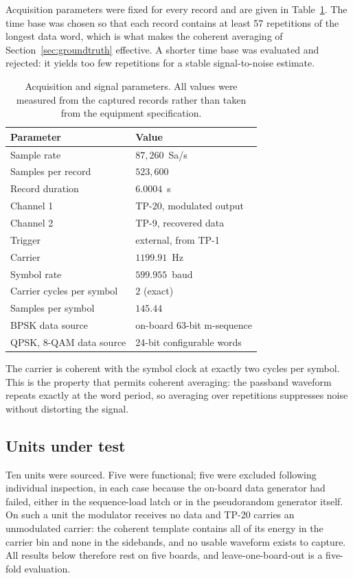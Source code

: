 \documentclass[journal]{IEEEtran}   %
\begin{document}
Acquisition parameters were fixed for every record and are given in
Table~\ref{tab:acq}. The time base was chosen so that each record contains at
least 57 repetitions of the longest data word, which is what makes the coherent
averaging of Section~\ref{sec:groundtruth} effective. A shorter time base was
evaluated and rejected: it yields too few repetitions for a stable
signal-to-noise estimate.

\begin{table}[!t]
\caption{Acquisition and signal parameters. All values were measured from the
captured records rather than taken from the equipment specification.}
\label{tab:acq}
\centering
\small
\begin{tabular}{ll}
\toprule
Parameter & Value \\
\midrule
Sample rate & $87{,}260$~Sa/s \\
Samples per record & $523{,}600$ \\
Record duration & $6.0004$~s \\
Channel 1 & TP-20, modulated output \\
Channel 2 & TP-9, recovered data \\
Trigger & external, from TP-1 \\
\midrule
Carrier & $1199.91$~Hz \\
Symbol rate & $599.955$~baud \\
Carrier cycles per symbol & $2$ (exact) \\
Samples per symbol & $145.44$ \\
\midrule
BPSK data source & on-board 63-bit m-sequence \\
QPSK, 8-QAM data source & 24-bit configurable words \\
\bottomrule
\end{tabular}
\end{table}

The carrier is coherent with the symbol clock at exactly two cycles per symbol.
This is the property that permits coherent averaging: the passband waveform
repeats exactly at the word period, so averaging over repetitions suppresses
noise without distorting the signal.

\subsection{Units under test}
Ten units were sourced. Five were functional; five were excluded following
individual inspection, in each case because the on-board data generator had
failed, either in the sequence-load latch or in the pseudorandom generator
itself. On such a unit the modulator receives no data and TP-20 carries an
unmodulated carrier: the coherent template contains all of its energy in the
carrier bin and none in the sidebands, and no usable waveform exists to capture.
All results below therefore rest on five boards, and leave-one-board-out is a
five-fold evaluation.
\end{document}
